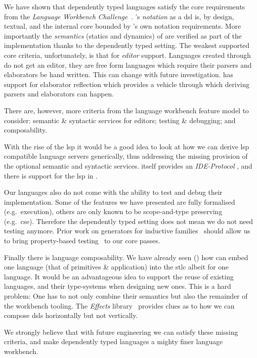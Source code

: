 We have shown that dependently typed languages satisfy the core requirements from the \emph{Language Workbench Challenge}~\cite{DBLP:conf/sle/ErdwegSVBBCGHKLKMPPSSSVVVWW13}.
%
\Velo{}'s \emph{notation} as a \ac{dsl} is, by design, textual, and the internal core bounded by \Idris{}'s own notation requirements.
%
More importantly the \emph{semantics} (statics and dynamics) of \Velo{}
are verified as part of the implementation thanks to the dependently typed setting.
%
The weakest supported core criteria, unfortunately, is that for \emph{editor} support.
%
Languages created through \Idris{} do not get an editor, they are free form languages which require their parsers and elaborators be hand written.
This can change with future investigation.
\Idris{} has support for elaborator reflection
which provides a vehicle through which deriving parsers and elaborators can happen.


There are, however, more criteria from the language workbench feature model to consider:
%
semantic \& syntactic services for editors;
%
testing \& debugging;
%
and
%
composability.
%

With the rise of the \ac{lsp} it would be a good idea to look at how we can derive \ac{lsp} compatible language servers generically, thus addressing the missing provision of the optional semantic and syntactic services.
\Idris{} itself provides an \emph{IDE-Protocol}
, and there is support for the \ac{lsp} in \Idris{}.

Our languages also do not come with the ability to test and debug their
implementation.
%
Some of the features we have presented are fully formalised (e.g.\ execution),
others are only known to be scope-and-type preserving (e.g.\ \ac{cse}).
%
Therefore the dependently typed setting does not mean we do not need testing
anymore.
%
Prior work on generators for inductive families~\cite{DBLP:journals/pacmpl/LampropoulosPP18}
should allow us to bring property-based testing~\cite{DBLP:conf/icfp/ClaessenH00} to our core passes.


Finally there is language composability.
%
We have already seen () how \Velo{} can embed one language (that of primitives \& application) into the \ac{stlc} albeit for one language.
%
It would be an advantageous idea to support the reuse of existing languages, and their type-systems when designing new ones.
%
This is a hard problem:
%
One has to not only combine their semantics but also the remainder of the workbench tooling.
%
The \emph{Effects} library~\cite{DBLP:conf/icfp/Brady13} provides clues as to how we can compose \acp{dsl} horizontally but not vertically.


We strongly believe that with future engineering we can satisfy these missing criteria,
and make dependently typed languages a mighty finer language workbench.


